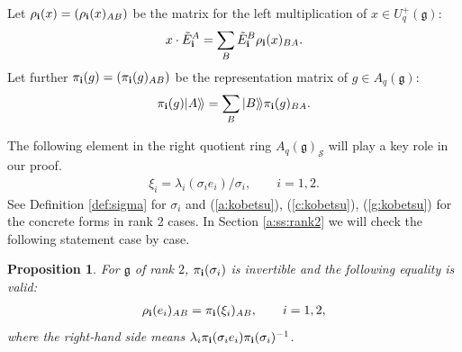 \documentclass[11pt]{article}
\newtheorem{proposition}{Proposition}
\newcommand{\geh}{\mathfrak{g}}
\begin{document}
Let $\rho_{\bf i}(x)=(\rho_{\bf i}(x)_{A B})$ be the matrix
for the left multiplication of  $x \in U^+_q(\geh)$:
\begin{gather}\label{a:lmul}
x \cdot {\tilde E}^{A}_{\bf i} = \sum_B  {\tilde E}^B_{\bf i}
\rho_{\bf i}(x)_{BA}.
\end{gather}
Let further $\pi_{\bf i}(g)=(\pi_{\bf i}(g)_{A B})$ be the
representation matrix of $g \in A_q(\geh)$:
\begin{gather}\label{a:pib}
\pi_{\bf i}(g) | A\rangle\!\rangle
= \sum_B |B\rangle\!\rangle \pi_{\bf i}(g)_{BA}.
\end{gather}

The following element in
the right quotient ring $A_q(\geh)_\mathcal{S}$
will play a key role in our proof.
\begin{gather}\label{a:xidef}
\xi_i = \lambda_i (\sigma_i e_i)/\sigma_i,\qquad i=1,2.
\end{gather}
See Def\/inition \ref{def:sigma} for $\sigma_i$
and (\ref{a:kobetsu}),  (\ref{c:kobetsu}),  (\ref{g:kobetsu})
for the concrete forms in rank 2 cases.
In Section \ref{a:ss:rank2} we will check
the following statement case by case.
\begin{proposition}\label{a:pr:rnk2}
For $\geh$ of rank $2$,
$\pi_{\bf i}(\sigma_i)$ is invertible and
the following equality is valid:
\begin{gather}\label{a:key}
\rho_{\bf i}(e_i)_{A B} = \pi_{\bf i}(\xi_i)_{A B}, \qquad i=1,2,
\end{gather}
where the right-hand side means
$\lambda_i\pi_{\bf i}(\sigma_ie_i) \pi_{\bf i}(\sigma_i)^{-1}$.
\end{proposition}
\end{document}
